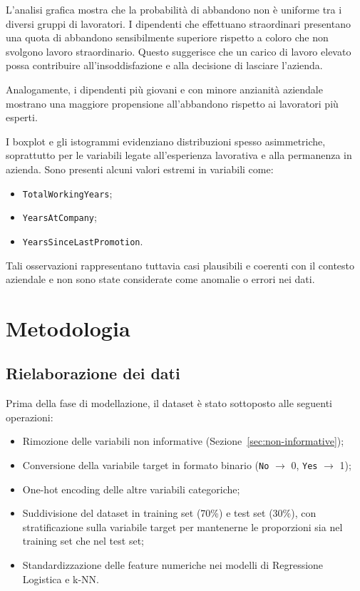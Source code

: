 \documentclass[11pt,a4paper]{article}
\begin{document}
L'analisi grafica mostra che la probabilit\`{a} di abbandono non \`{e} uniforme tra i diversi gruppi di lavoratori. I dipendenti che effettuano straordinari presentano una quota di abbandono sensibilmente superiore rispetto a coloro che non svolgono lavoro straordinario. Questo suggerisce che un carico di lavoro elevato possa contribuire all'insoddisfazione e alla decisione di lasciare l'azienda.

Analogamente, i dipendenti pi\`{u} giovani e con minore anzianit\`{a} aziendale mostrano una maggiore propensione all'abbandono rispetto ai lavoratori pi\`{u} esperti.

I boxplot e gli istogrammi evidenziano distribuzioni spesso asimmetriche, soprattutto per le variabili legate all'esperienza lavorativa e alla permanenza in azienda. Sono presenti alcuni valori estremi in variabili come:
\begin{itemize}
    \item \texttt{TotalWorkingYears};
    \item \texttt{YearsAtCompany};
    \item \texttt{YearsSinceLastPromotion}.
\end{itemize}
Tali osservazioni rappresentano tuttavia casi plausibili e coerenti con il contesto aziendale e non sono state considerate come anomalie o errori nei dati.


\section{Metodologia}
\label{sec:metodologia}

\subsection{Rielaborazione dei dati}

Prima della fase di modellazione, il dataset \`{e} stato sottoposto alle seguenti operazioni:
\begin{itemize}
    \item Rimozione delle variabili non informative (Sezione~\ref{sec:non-informative});
    \item Conversione della variabile target in formato binario (\texttt{No} $\rightarrow$ 0, \texttt{Yes} $\rightarrow$ 1);
    \item One-hot encoding delle altre variabili categoriche;
    \item Suddivisione del dataset in training set (70\%) e test set (30\%), con stratificazione sulla variabile target per mantenerne le proporzioni sia nel training set che nel test set;
    \item Standardizzazione delle feature numeriche nei modelli di Regressione Logistica e k-NN.
\end{itemize}
\end{document}
